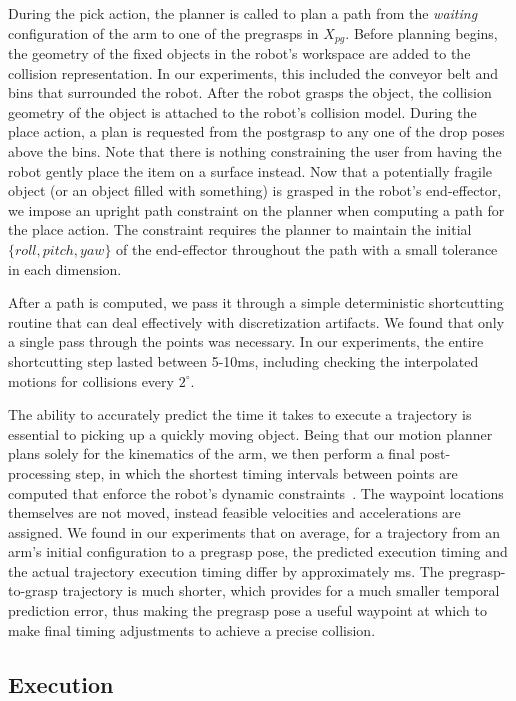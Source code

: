 \documentclass[letterpaper, 10 pt, conference]{ieeeconf}  %
\begin{document}
During the pick action, the planner is called to plan a path from the \textit{waiting} configuration of the arm to one of the pregrasps in $X_{pg}$. Before planning begins, the geometry of the fixed objects in the robot's workspace are added to the collision representation. In our experiments, this included the conveyor belt and bins that surrounded the robot. After the robot grasps the object, the collision geometry of the object is attached to the robot's collision model. During the place action, a plan is requested from the postgrasp to any one of the drop poses above the bins. Note that there is nothing constraining the user from having the robot gently place the item on a surface instead. Now that a potentially fragile object (or an object filled with something) is grasped in the robot's end-effector, we impose an upright path constraint on the planner when computing a path for the place action. The constraint requires the planner to maintain the initial $\{roll, pitch, yaw\}$ of the end-effector throughout the path with a small tolerance in each dimension.
 
After a path is computed, we pass it through a simple deterministic shortcutting routine that can deal effectively with discretization artifacts. We found that only a single pass through the points was necessary. In our experiments, the entire shortcutting step lasted between 5-10ms, including checking the interpolated motions for collisions every $2^{\circ}$.

The ability to accurately predict the time it takes to execute a
trajectory is essential to picking up a quickly moving object. Being
that our motion planner plans solely for the kinematics of the arm, we
then perform a final post-processing step, in which the shortest
timing intervals between points are computed that enforce the robot's
dynamic constraints~\cite{IterativeSmoother}. The waypoint locations
themselves are not moved, instead feasible velocities and
accelerations are assigned. We found in our experiments that on
average, for a trajectory from an arm's initial configuration to a
pregrasp pose, the predicted execution timing and the actual
trajectory execution timing differ by approximately \unit[80]{ms}. The
pregrasp-to-grasp trajectory is much shorter, which provides for a
much smaller temporal prediction error, thus making the pregrasp pose
a useful waypoint at which to make final timing adjustments to achieve
a precise collision.

\subsection{Execution}
\end{document}
